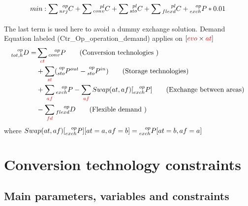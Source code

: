 \documentclass{article}
\begin{document}
$$min : \sum_{} \prescript{op}{nrj}{C}  + \sum \prescript{pl}{conv}{C} + \sum \prescript{pl}{sto}{C} + \sum \prescript{pl}{flexd}{C} + \prescript{op}{exch}{P}*0.01  $$
The last term is used here to avoid a dummy exchange solution. 
Demand Equation labeled (Ctr\_Op\_operation\_demand) applies on   $[\textcolor{red}{evo}  \times \textcolor{red}{at}]$
\begin{align} 
    \prescript{op}{tot,h}{D} = & \sum_{\textcolor{red}{ct}}  \prescript{op}{conv}{P} \tag{Conversion technologies } \\ 
    &+\sum_{\textcolor{red}{st}} (\prescript{op}{sto}{P^{out}} -\prescript{op}{sto}{P^{in}}) \tag{Storage technologies}\\
    &+ \sum_{\textcolor{red}{af}}  \prescript{op}{exch}{P} - \sum_{\textcolor{red}{af}} Swap(at,af)[ \prescript{op}{exch}{P}]
    \tag{Exchange between areas}\\   
    & - \sum_{\textcolor{red}{fd}}  \prescript{op}{flexd}{D} \tag{Flexible demand  } \\   
\end{align}
where $Swap(at,af)[ \prescript{op}{exch}{P}][at = a,af = b] = \prescript{op}{exch}{P}[at = b,af = a] $



\newpage

\section{Conversion technology constraints}

\subsection{Main parameters, variables and constraints}
\end{document}
